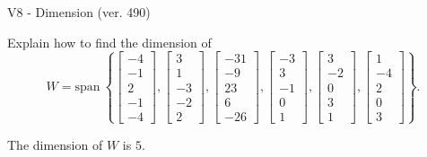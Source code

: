 \begin{exercise}
  \begin{exerciseTitle}V8 - Dimension (ver. 490)\end{exerciseTitle}
  \begin{exerciseStatement}
    Explain how to find the dimension of 
\[W=\mathrm{span}\ \left\{\left[\begin{array}{r}
-4 \\
-1 \\
2 \\
-1 \\
-4
\end{array}\right] , \left[\begin{array}{r}
3 \\
1 \\
-3 \\
-2 \\
2
\end{array}\right] , \left[\begin{array}{r}
-31 \\
-9 \\
23 \\
6 \\
-26
\end{array}\right] , \left[\begin{array}{r}
-3 \\
3 \\
-1 \\
0 \\
1
\end{array}\right] , \left[\begin{array}{r}
3 \\
-2 \\
0 \\
3 \\
1
\end{array}\right] , \left[\begin{array}{r}
1 \\
-4 \\
2 \\
0 \\
3
\end{array}\right]\right\}.\]



  \end{exerciseStatement}
  \begin{exerciseAnswer}
   The dimension of \(W\) is  \(5\).
  


  \end{exerciseAnswer}
\end{exercise}